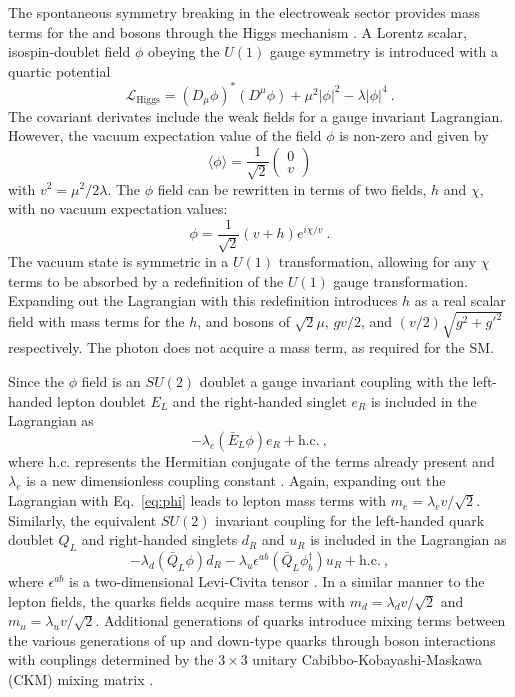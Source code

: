 The spontaneous symmetry breaking in the electroweak sector provides mass
terms for the \PW and \PZ bosons through the Higgs mechanism
\cite{PhysRevLett.13.321,PhysRevLett.13.508,PhysRevLett.13.585}. A Lorentz
scalar, isospin-doublet field $\phi$ obeying the $U(1)$ gauge symmetry is
introduced with a quartic potential
%
\begin{equation}
    \mathcal{L}_{\mathrm{Higgs}} = (D_\mu\phi)^*(D^\mu\phi) +\mu^2|\phi|^2 - \lambda|\phi|^4\ .
\end{equation}
%
The covariant derivates include the weak fields for a gauge invariant Lagrangian. However, the vacuum expectation value of the field $\phi$ is non-zero and given by
%
\begin{equation}
    \langle \phi \rangle = \frac{1}{\sqrt{2}}
    \begin{pmatrix}
        0 \\ v
    \end{pmatrix}
\end{equation}
%
with $v^2=\mu^2/2\lambda$. The $\phi$ field can be rewritten in terms of two fields, $h$ and $\chi$, with no vacuum expectation values:
%
\begin{equation}\label{eq:phi}
    \phi = \frac{1}{\sqrt{2}}(v + h)e^{i\chi/v}\ .
\end{equation}
%
The vacuum state is symmetric in a $U(1)$ transformation, allowing for any
$\chi$ terms to be absorbed by a redefinition of the $U(1)$ gauge
transformation. Expanding out the Lagrangian with this redefinition introduces
$h$ as a real scalar field with mass terms for the $h$, \PW and \PZ bosons of
$\sqrt{2}\mu$, $gv/2$, and $(v/2)\sqrt{g^2+g'^2}$ respectively. The photon
does not acquire a mass term, as required for the SM.

Since the $\phi$ field is an $SU(2)$ doublet a gauge invariant coupling with
the left-handed lepton doublet $E_L$ and the right-handed singlet $e_R$ is
included in the Lagrangian as
%
\begin{equation}
    -\lambda_e (\bar{E}_L \phi) e_R + \mathrm{h.c.}\ ,
\end{equation}
%
where h.c. represents the Hermitian conjugate of the terms already present and
$\lambda_e$ is a new dimensionless coupling constant \cite{Peskin:1995ev}.
Again, expanding out the Lagrangian with Eq.~\ref{eq:phi} leads to lepton mass
terms with $m_e = \lambda_e v/\sqrt{2}$. Similarly, the equivalent $SU(2)$
invariant coupling for the left-handed quark doublet $Q_L$ and right-handed
singlets $d_R$ and $u_R$ is included in the Lagrangian as
%
\begin{equation}
    -\lambda_d (\bar{Q}_L\phi) d_R - \lambda_u \epsilon^{ab}(\bar{Q}_L\phi_b^{\dagger})u_R + \mathrm{h.c.}\ ,
\end{equation}
%
where $\epsilon^{ab}$ is a two-dimensional Levi-Civita tensor \cite{Peskin:1995ev}.
In a similar manner to the lepton fields, the quarks fields acquire mass terms
with $m_d = \lambda_d v/\sqrt{2}$ and $m_u = \lambda_u v/\sqrt{2}$. Additional
generations of quarks introduce mixing terms between the various generations
of up and down-type quarks through \PW boson interactions with couplings
determined by the $3\times 3$ unitary Cabibbo-Kobayashi-Maskawa (CKM) mixing
matrix \cite{PhysRevLett.10.531,Kobayashi:1973fv}.


